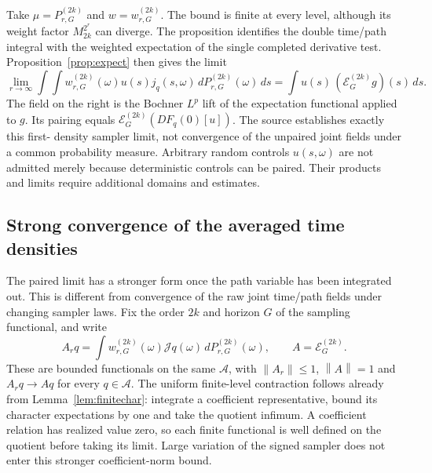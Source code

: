 \documentclass[11pt]{article}
\theoremstyle{remark}\newtheorem{remark}[theorem]{Remark}
\newcommand{\A}{\mathcal A}\newcommand{\X}{\mathcal X}
\newcommand{\E}{\mathcal E}\newcommand{\norm}[1]{\left\lVert#1\right\rVert}
\begin{document}
Take $\mu=P^{(2k)}_{r,G}$ and $w=w^{(2k)}_{r,G}$. The bound is finite
at every level, although its weight factor $M_{2k}^{2^r}$ can diverge.
The proposition identifies the double time/path integral with the
weighted expectation of the single completed derivative test.
Proposition~\ref{prop:expect} then gives the limit
\[
 \lim_{r\to\infty}\int\!\int
 w^{(2k)}_{r,G}(\omega)u(s)j_q(s,\omega)
 \,dP^{(2k)}_{r,G}(\omega)\,ds
 =\int u(s)\, (\E^{(2k)}_G g)(s)\,ds.
\]
The field on the right is the Bochner $L^p$ lift of the expectation
functional applied to $g$. Its pairing equals
$\E^{(2k)}_G(DF_q(0)[u])$. The source establishes exactly this first-
density sampler limit, not convergence of the unpaired joint fields
under a common probability measure. Arbitrary random controls
$u(s,\omega)$ are not admitted merely because deterministic controls
can be paired. Their products and limits require additional domains
and estimates.

\subsection{Strong convergence of the averaged time densities}
The paired limit has a stronger form once the path variable has
been integrated out. This is different from convergence of the raw
joint time/path fields under changing sampler laws. Fix the order
$2k$ and horizon $G$ of the sampling functional, and write
\[
 A_rq=\int w^{(2k)}_{r,G}(\omega)\mathcal Jq(\omega)
                 \,dP^{(2k)}_{r,G}(\omega),\qquad A=\E^{(2k)}_G.
\]
These are bounded functionals on the same $\A$, with
$\norm{A_r}\le1$, $\norm A=1$ and $A_rq\to Aq$ for every $q\in\A$.
The uniform finite-level contraction follows already from
Lemma~\ref{lem:finitechar}: integrate a coefficient representative,
bound its character expectations by one and take the quotient
infimum. A coefficient relation has realized value zero, so each
finite functional is well defined on the quotient before taking
its limit. Large variation of the signed sampler does not enter
this stronger coefficient-norm bound.
\end{document}
